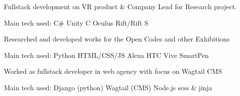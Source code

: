 \documentclass[a4paper]{deedy-resume_twopage} %
\begin{document}
\begin{minipage}[t]{0.66\textwidth}
  \sectionspace %



  \begin{tightitemize}
  \item Fullstack development on VR product \& Company Lead for Research project.
  \end{tightitemize}
  Main tech used: \textbullet{} C\# \textbullet{} Unity \textbullet{} C \textbullet{} Oculus Rift/Rift S

  \sectionspace %



  \begin{tightitemize}
  \item Researched and developed works for the Open Codes and other Exhibitions
  \end{tightitemize}
  Main tech used: \textbullet{} Python \textbullet{} HTML/CSS/JS \textbullet{} Alexa \textbullet{} HTC Vive \textbullet{} SmartPen \textbullet{}

  \sectionspace %



  \begin{tightitemize}
  \item Worked as fullstack developer in web agency with focus on Wagtail CMS
  \end{tightitemize}
  Main tech used: \textbullet{} Django (python) \textbullet{} Wagtail (CMS) \textbullet{} Node.js \textbullet{} scss \& jinja


\end{minipage}
\end{document}
